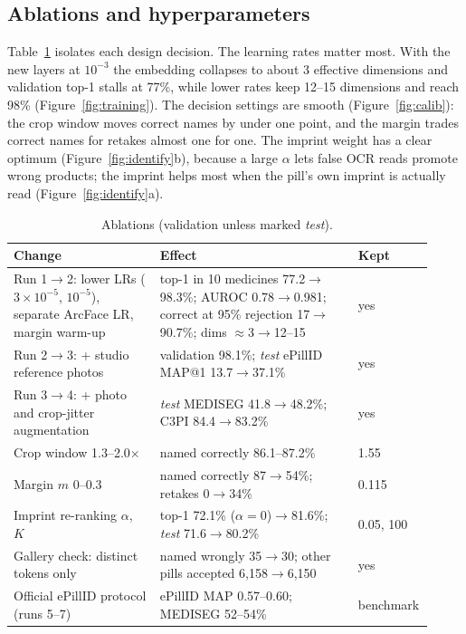 \subsection{Ablations and hyperparameters}
\label{sec:ablations}

Table~\ref{tab:ablation} isolates each design decision. The learning rates matter most. With the new layers at
$10^{-3}$ the embedding collapses to about 3 effective dimensions and validation top-1 stalls at 77\%, while lower rates
keep 12--15 dimensions and reach 98\% (Figure~\ref{fig:training}). The decision settings are smooth
(Figure~\ref{fig:calib}): the crop window moves correct names by under one point, and the margin trades correct names
for retakes almost one for one. The imprint weight has a clear optimum (Figure~\ref{fig:identify}b), because a large
$\alpha$ lets false OCR reads promote wrong products; the imprint helps most when the pill's own imprint is actually
read (Figure~\ref{fig:identify}a).

\begin{table}[t]
  \caption{Ablations (validation unless marked \emph{test}).}
  \label{tab:ablation}
  \centering
  \small
  \begin{tabular}{@{}p{0.34\linewidth}p{0.46\linewidth}p{0.12\linewidth}@{}}
    \toprule
    Change & Effect & Kept \\
    \midrule
    Run 1$\to$2: lower LRs ($3{\times}10^{-5}$, $10^{-5}$), separate ArcFace LR, margin warm-up & top-1 in 10
      medicines 77.2$\to$98.3\%; AUROC 0.78$\to$0.981; correct at 95\% rejection 17$\to$90.7\%; dims
      $\approx$3$\to$12--15 & yes \\
    Run 2$\to$3: + studio reference photos & validation 98.1\%; \emph{test} ePillID MAP@1 13.7$\to$37.1\% & yes \\
    Run 3$\to$4: + photo and crop-jitter augmentation & \emph{test} MEDISEG 41.8$\to$48.2\%; C3PI 84.4$\to$83.2\%
      & yes \\
    Crop window 1.3--2.0$\times$ & named correctly 86.1--87.2\% & 1.55 \\
    Margin $m$ 0--0.3 & named correctly 87$\to$54\%; retakes 0$\to$34\% & 0.115 \\
    Imprint re-ranking $\alpha$, $K$ & top-1 72.1\% ($\alpha{=}0$)$\to$81.6\%; \emph{test} 71.6$\to$80.2\%
      & 0.05, 100 \\
    Gallery check: distinct tokens only & named wrongly 35$\to$30; other pills accepted 6,158$\to$6,150 & yes \\
    Official ePillID protocol (runs 5--7) & ePillID MAP 0.57--0.60; MEDISEG 52--54\% & benchmark \\
    \bottomrule
  \end{tabular}
\end{table}

